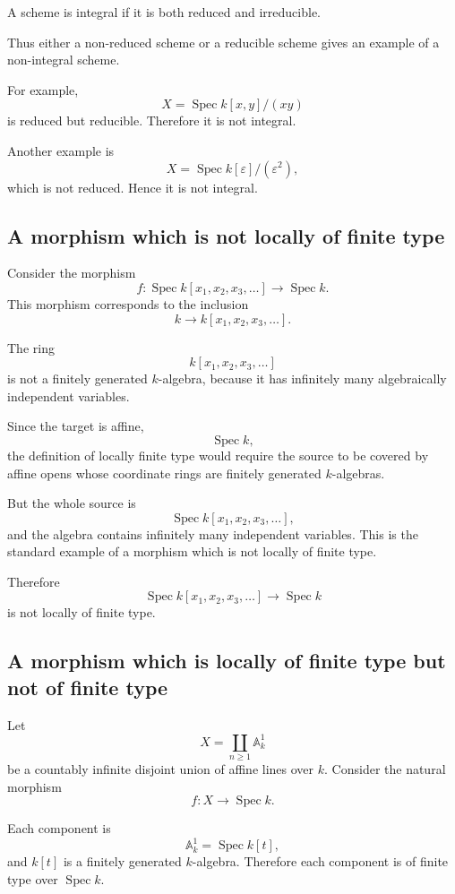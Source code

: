A scheme is integral if it is both reduced and irreducible.

Thus either a non-reduced scheme or a reducible scheme gives an example of a non-integral scheme.

For example,
\[
X=\operatorname{Spec} k[x,y]/(xy)
\]
is reduced but reducible. Therefore it is not integral.

Another example is
\[
X=\operatorname{Spec} k[\varepsilon]/(\varepsilon^2),
\]
which is not reduced. Hence it is not integral.

\subsection*{A morphism which is not locally of finite type}

Consider the morphism
\[
f:\operatorname{Spec} k[x_1,x_2,x_3,\dots]\longrightarrow \operatorname{Spec} k.
\]
This morphism corresponds to the inclusion
\[
k\longrightarrow k[x_1,x_2,x_3,\dots].
\]

The ring
\[
k[x_1,x_2,x_3,\dots]
\]
is not a finitely generated \(k\)-algebra, because it has infinitely many algebraically independent variables.

Since the target is affine,
\[
\operatorname{Spec} k,
\]
the definition of locally finite type would require the source to be covered by affine opens whose coordinate rings are finitely generated \(k\)-algebras.

But the whole source is
\[
\operatorname{Spec} k[x_1,x_2,x_3,\dots],
\]
and the algebra contains infinitely many independent variables. This is the standard example of a morphism which is not locally of finite type.

Therefore
\[
\operatorname{Spec} k[x_1,x_2,x_3,\dots]\longrightarrow \operatorname{Spec} k
\]
is not locally of finite type.

\subsection*{A morphism which is locally of finite type but not of finite type}

Let
\[
X=\coprod_{n\geq 1}\mathbb A_k^1
\]
be a countably infinite disjoint union of affine lines over \(k\). Consider the natural morphism
\[
f:X\longrightarrow \operatorname{Spec} k.
\]

Each component is
\[
\mathbb A_k^1=\operatorname{Spec} k[t],
\]
and \(k[t]\) is a finitely generated \(k\)-algebra. Therefore each component is of finite type over \(\operatorname{Spec} k\).

